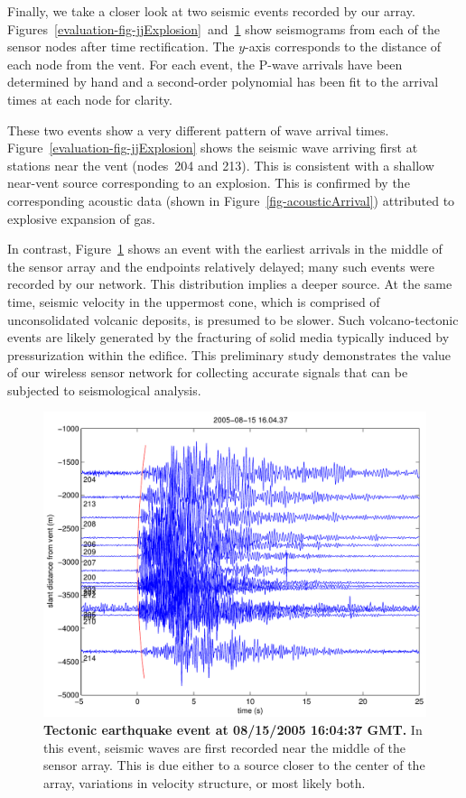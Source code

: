 Finally, we take a closer look at two seismic events recorded by our array.
Figures~\ref{evaluation-fig-jjExplosion}~and~\ref{evaluation-fig-jjTectonic}
show seismograms from each of the sensor nodes after time rectification.  The
$y$-axis corresponds to the distance of each node from the vent.  For each
event, the P-wave arrivals have been determined by hand and a second-order
polynomial has been fit to the arrival times at each node for clarity.

These two events show a very different pattern of wave arrival times.
Figure~\ref{evaluation-fig-jjExplosion} shows the seismic wave arriving first
at stations near the vent (nodes~204 and 213). This is consistent with a
shallow near-vent source corresponding to an explosion. This is confirmed by
the corresponding acoustic data (shown in Figure~\ref{fig-acousticArrival})
attributed to explosive expansion of gas. 

In contrast, Figure~\ref{evaluation-fig-jjTectonic} shows an event with the
earliest arrivals in the middle of the sensor array and the endpoints
relatively delayed; many such events were recorded by our network.  This
distribution implies a deeper source.  At the same time, seismic velocity in
the uppermost cone, which is comprised of unconsolidated volcanic deposits,
is presumed to be slower.  Such volcano-tectonic events are likely generated
by the fracturing of solid media typically induced by pressurization within
the edifice. This preliminary study demonstrates the value of our wireless
sensor network for collecting accurate signals that can be subjected to
seismological analysis.

\begin{figure}[t]
\label{evaluation-fig-jjTectonic}
\begin{center}
\includegraphics[width=\hsize]{./5-evaluation/figs/fidelity/seismicArrival/johnson/2005-08-15_16-04-37.pdf}
\end{center}
\caption{\textbf{Tectonic earthquake event at 08/15/2005 16:04:37 GMT.}
In this event, seismic waves are first recorded near the middle of the sensor
array. This is due either to a source closer to the center of the array,
variations in velocity structure, or most likely both.}
\end{figure}


